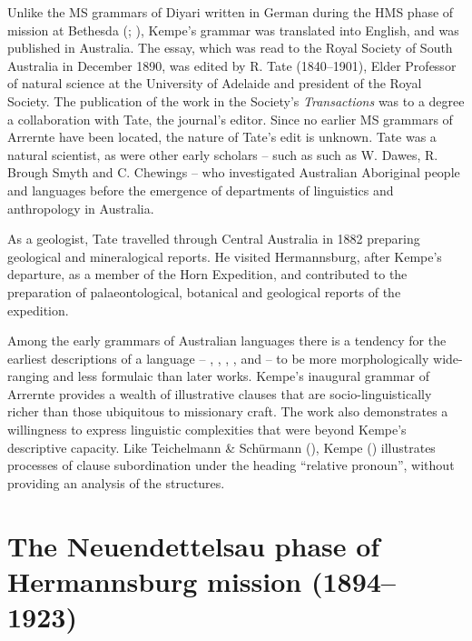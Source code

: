 Unlike the MS grammars of Diyari written in German during the HMS phase of mission at Bethesda (\citealt{koch_untitled_1868}; \citealt{Schoknecht1872}), Kempe’s grammar was translated into English, and was published in Australia. The essay, which was read to the Royal Society of South Australia in December 1890, was edited by R. Tate (1840--1901),  {Elder} Professor of {natural science} at the {University of Adelaide} and president of the Royal Society. The publication of the work in the Society’s \textit{Transactions} \citeyearpar{kempe_grammar_1891} was to a degree a collaboration with Tate, the journal’s editor. Since no earlier MS grammars of Arrernte have been located, the nature of Tate’s edit is unknown. Tate was a natural scientist, as were other early scholars -- such as such as W. Dawes, R. Brough Smyth and C. Chewings -- who investigated Australian Aboriginal people and languages before the emergence of departments of linguistics and anthropology in Australia.

As a geologist, Tate travelled through Central Australia in 1882 preparing geological and mineralogical reports. He visited Hermannsburg, after Kempe’s departure, as a member of the Horn Expedition, and contributed to the preparation of palaeontological, botanical and geological reports of the expedition.

Among the early grammars of Australian languages there is a tendency for the earliest descriptions of a language – \citet{threlkeld_australian_1834}, \citet{teichelmann_outlines_1840}, \citet{meyer_vocabulary_1843}, \citet{koch_untitled_1868}, and \citet{roth_ethnological_1897} – to be more morphologically wide-ranging and less formulaic than later works. Kempe’s inaugural grammar of Arrernte \citeyearpar{kempe_grammar_1891} provides a wealth of illustrative clauses that are socio-linguistically richer than those ubiquitous to missionary craft. The work also demonstrates a willingness to express linguistic complexities that were beyond Kempe’s descriptive capacity. Like Teichelmann \& Schürmann (), Kempe () illustrates processes of clause subordination under the heading ``relative pronoun'', without providing an analysis of the structures.

\section{The Neuendettelsau phase of Hermannsburg mission (1894--1923)}
\label{sec:key:9.2}\label{bkm:Ref456881682}

